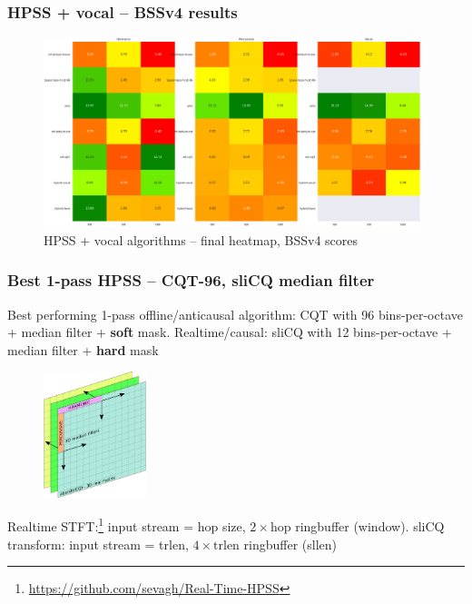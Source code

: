 \documentclass{beamer}
\begin{document}
\begin{frame}
	\frametitle{HPSS + vocal -- BSSv4 results}
	\begin{figure}[ht]
		\includegraphics[width=11cm]{../evaluation/heatmaps/Final_Vocal_BSSv4_abbrev.png}
		\caption{HPSS + vocal algorithms -- final heatmap, BSSv4 scores}
	\end{figure}
\end{frame}

\begin{frame}
	\frametitle{Best 1-pass HPSS -- CQT-96, sliCQ median filter}
	Best performing 1-pass offline/anticausal algorithm: CQT with 96 bins-per-octave + median filter + \textbf{soft} mask. Realtime/causal: sliCQ with 12 bins-per-octave + median filter + \textbf{hard} mask\\
	\begin{figure}[ht]
		\vspace{-0.5em}
		\includegraphics[width=3cm]{./singlemfilt3.png}
		\vspace{-0.75em}
	\end{figure}
	Realtime STFT:\footnote{\url{https://github.com/sevagh/Real-Time-HPSS}} input stream = hop size, $2 \times \text{hop}$ ringbuffer (window). sliCQ transform: input stream = trlen, $4 \times \text{trlen}$ ringbuffer (sllen)
\end{frame}

\end{document}
